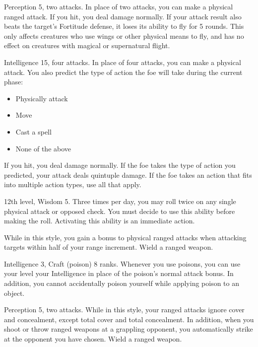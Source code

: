 \featpre Perception 5, two attacks.
\featben In place of two attacks, you can make a physical ranged attack.
If you hit, you deal damage normally.
If your attack result also beats the target's Fortitude defense, it loses its ability to fly for 5 rounds.
This only affects creatures who use wings or other physical means to fly, and has no effect on creatures with magical or supernatural flight.

\featpre Intelligence 15, four attacks.
\featben In place of four attacks, you can make a physical attack.
You also predict the type of action the foe will take during the current phase:
\begin{itemize}
    \item Physically attack
    \item Move
    \item Cast a spell
    \item None of the above
\end{itemize}
If you hit, you deal damage normally.
If the foe takes the type of action you predicted, your attack deals quintuple damage.
If the foe takes an action that fits into multiple action types, use all that apply.

\featpres 12th level, Wisdom 5.
\featben Three times per day, you may roll twice on any single physical attack or opposed check.
You must decide to use this ability before making the roll.
Activating this ability is an immediate action.

\featben While in this style, you gain a  bonus to physical ranged attacks when attacking targets within half of your range increment.
\stylereq Wield a ranged weapon.

\featpres Intelligence 3, Craft (poison) 8 ranks.
\featben Whenever you use poisons, you can use your level \add your Intelligence in place of the poison's normal attack bonus.
In addition, you cannot accidentally poison yourself while applying poison to an object.

\featpres Perception 5, two attacks.
\featben While in this style, your ranged attacks ignore cover and concealment, except total cover and total concealment.
In addition, when you shoot or throw ranged weapons at a grappling opponent, you automatically strike at the opponent you have chosen.
\stylereq Wield a ranged weapon.

